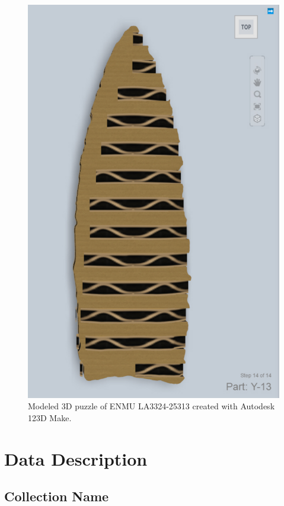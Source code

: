 \documentclass[preprint,12pt]{elsarticle}
\begin{document}
\begin{figure}[ht]\centering
\includegraphics[width=\linewidth]{Fig4}
\caption{Modeled 3D puzzle of ENMU LA3324-25313 created with Autodesk 123D Make.}
\label{fig:Fig4}
\end{figure}

\section{Data Description}

\subsection{Collection Name}
\end{document}
